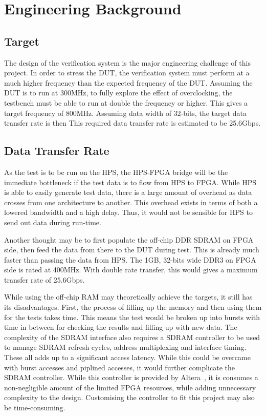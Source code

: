 \section{Engineering Background}

\subsection{Target}
The design of the verification system is the major engineering challenge of this
project.
In order to stress the DUT, the verification system must perform at a much
higher frequency than the expected frequency of the DUT.
Assuming the DUT is to run at 300MHz, to fully explore the effect of
overclocking, the testbench must be able to run at double the frequency or
higher.
This gives a target frequency of 800MHz.
Assuming data width of 32-bits, the target data transfer rate is then 
This required data transfer rate is estimated to be 25.6Gbps.

\subsection{Data Transfer Rate}
As the test is to be run on the HPS, the HPS-FPGA bridge will be the
immediate bottleneck if the test data is to flow from HPS to FPGA.
While HPS is able to easily generate test data,
there is a large amount of overhead as data crosses from one architecture
to another.
This overhead exists in terms of both a lowered bandwidth and a high delay.
Thus, it would not be sensible for HPS to send out data during run-time.

Another thought may be to first populate the off-chip DDR SDRAM on FPGA
side, then feed the data from there to the DUT during test.
This is already much faster than passing the data from HPS.
The 1GB, 32-bits wide DDR3 on FPGA side is rated at 400MHz.
With double rate transfer, this would gives a maximum transfer rate of 25.6Gbps.

While using the off-chip RAM may theoretically achieve the targets,
it still has its disadvantages.
First, the process of filling up the memory and then using them for the tests
takes time.
This means the test would be broken up into bursts with time in between for
checking the results and filling up with new data.
The complexity of the SDRAM interface also requires a SDRAM controller to be
used to manage SDRAM refresh cycles, address multiplexing and interface timing.
These all adds up to a significant access latency.
While this could be overcame with burst accesses and piplined accesses,
it would further complicate the SDRAM controller.
While this controller is provided by Altera~\cite{Altera3}, it is consumes
a non-negligible amount of the limited FPGA resources, while adding
unnecessary complexity to the design.
Customising the controller to fit this project may also be time-consuming.

